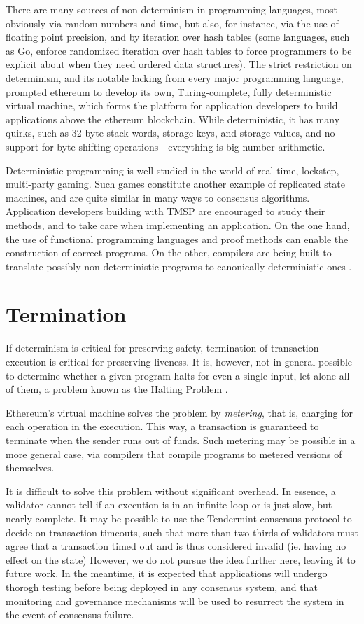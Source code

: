There are many sources of non-determinism in programming languages, most obviously via random numbers and time,
but also, for instance, via the use of floating point precision, and by iteration over hash tables 
(some languages, such as Go, enforce randomized iteration over hash tables to force programmers to be explicit about when they need ordered data structures).
The strict restriction on determinism, and its notable lacking from every major programming language,
prompted ethereum to develop its own, Turing-complete, fully deterministic virtual machine,
which forms the platform for application developers to build applications above the ethereum blockchain.
While deterministic, it has many quirks, such as 32-byte stack words, storage keys, and storage values,
and no support for byte-shifting operations - everything is big number arithmetic.

Deterministic programming is well studied in the world of real-time, lockstep, multi-party gaming.
Such games constitute another example of replicated state machines, and are quite similar in many ways to consensus algorithms.
Application developers building with TMSP are encouraged to study their methods, and to take care when implementing an application.
On the one hand, the use of functional programming languages and proof methods can enable the construction of correct programs.
On the other, compilers are being built to translate possibly non-deterministic programs to canonically deterministic ones \cite{deterministicjs}.

\section{Termination}

If determinism is critical for preserving safety, termination of transaction execution is critical for preserving liveness.
It is, however, not in general possible to determine whether a given program halts for even a single input, let alone all of them,
a problem known as the Halting Problem \cite{halting, davis1958computability}.

Ethereum's virtual machine solves the problem by \emph{metering}, that is, charging for each operation in the execution.
This way, a transaction is guaranteed to terminate when the sender runs out of funds.
Such metering may be possible in a more general case, 
via compilers that compile programs to metered versions of themselves.

It is difficult to solve this problem without significant overhead.
In essence, a validator cannot tell if an execution is in an infinite loop or is just slow, but nearly complete.
It may be possible to use the Tendermint consensus protocol to decide on transaction timeouts, 
such that more than two-thirds of validators must agree that a transaction timed out and is thus considered invalid (ie. having no effect on the state)
However, we do not pursue the idea further here, leaving it to future work. 
In the meantime, it is expected that applications will undergo thorogh testing before being deployed in any consensus system,
and that monitoring and governance mechanisms will be used to resurrect the system in the event of consensus failure.

